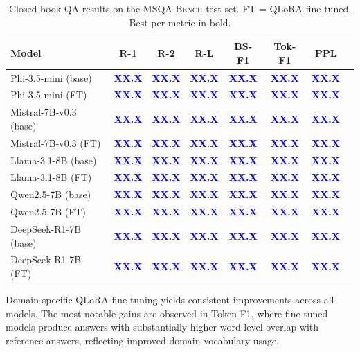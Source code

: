 \documentclass[11pt]{article}
\newcommand{\msqa}{\textsc{MSQA-Bench}}
\newcommand{\placeholder}[1]{\textcolor{blue}{\textbf{#1}}}
\begin{document}
\begin{table}[t]
\caption{Closed-book QA results on the \msqa{} test set. FT = QLoRA fine-tuned. Best per metric in bold.}
\label{tab:llm_results}
\centering
\small
\begin{tabular}{lccccccc}
\toprule
\textbf{Model} & \textbf{R-1} & \textbf{R-2} & \textbf{R-L} & \textbf{BS-F1} & \textbf{Tok-F1} & \textbf{PPL} \\
\midrule
Phi-3.5-mini (base) & \placeholder{XX.X} & \placeholder{XX.X} & \placeholder{XX.X} & \placeholder{XX.X} & \placeholder{XX.X} & \placeholder{XX.X} \\
Phi-3.5-mini (FT) & \placeholder{XX.X} & \placeholder{XX.X} & \placeholder{XX.X} & \placeholder{XX.X} & \placeholder{XX.X} & \placeholder{XX.X} \\
\midrule
Mistral-7B-v0.3 (base) & \placeholder{XX.X} & \placeholder{XX.X} & \placeholder{XX.X} & \placeholder{XX.X} & \placeholder{XX.X} & \placeholder{XX.X} \\
Mistral-7B-v0.3 (FT) & \placeholder{XX.X} & \placeholder{XX.X} & \placeholder{XX.X} & \placeholder{XX.X} & \placeholder{XX.X} & \placeholder{XX.X} \\
\midrule
Llama-3.1-8B (base) & \placeholder{XX.X} & \placeholder{XX.X} & \placeholder{XX.X} & \placeholder{XX.X} & \placeholder{XX.X} & \placeholder{XX.X} \\
Llama-3.1-8B (FT) & \placeholder{XX.X} & \placeholder{XX.X} & \placeholder{XX.X} & \placeholder{XX.X} & \placeholder{XX.X} & \placeholder{XX.X} \\
\midrule
Qwen2.5-7B (base) & \placeholder{XX.X} & \placeholder{XX.X} & \placeholder{XX.X} & \placeholder{XX.X} & \placeholder{XX.X} & \placeholder{XX.X} \\
Qwen2.5-7B (FT) & \placeholder{XX.X} & \placeholder{XX.X} & \placeholder{XX.X} & \placeholder{XX.X} & \placeholder{XX.X} & \placeholder{XX.X} \\
\midrule
DeepSeek-R1-7B (base) & \placeholder{XX.X} & \placeholder{XX.X} & \placeholder{XX.X} & \placeholder{XX.X} & \placeholder{XX.X} & \placeholder{XX.X} \\
DeepSeek-R1-7B (FT) & \placeholder{XX.X} & \placeholder{XX.X} & \placeholder{XX.X} & \placeholder{XX.X} & \placeholder{XX.X} & \placeholder{XX.X} \\
\bottomrule
\end{tabular}
\end{table}

Domain-specific QLoRA fine-tuning yields consistent improvements across all models. The most notable gains are observed in Token F1, where fine-tuned models produce answers with substantially higher word-level overlap with reference answers, reflecting improved domain vocabulary usage.
\end{document}
